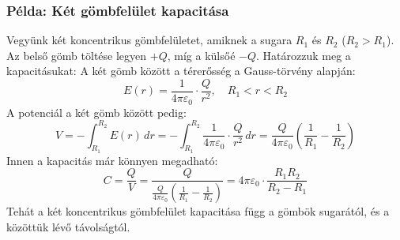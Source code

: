 \documentclass[a4paper,12pt]{article}
\begin{document}
\subsubsection*{Példa: Két gömbfelület kapacitása}
Vegyünk két koncentrikus gömbfelületet, amiknek a sugara $R_1$ és $R_2$ ($R_2 > R_1$). Az belső gömb töltése legyen $+Q$, míg a külsőé $-Q$. Határozzuk meg a kapacitásukat:
A két gömb között a térerősség a Gauss-törvény alapján:
\begin{equation}
    E(r) = \frac{1}{4 \pi \varepsilon_0} \cdot \frac{Q}{r^2}, \quad R_1 < r < R_2
\end{equation}
A potenciál a két gömb között pedig:
\begin{equation}
    V = - \int_{R_1}^{R_2} E(r) \, dr = - \int_{R_1}^{R_2} \frac{1}{4 \pi \varepsilon_0} \cdot \frac{Q}{r^2} \, dr = \frac{Q}{4 \pi \varepsilon_0} \left( \frac{1}{R_1} - \frac{1}{R_2} \right)
\end{equation}
Innen a kapacitás már könnyen megadható:
\begin{equation}
    C = \frac{Q}{V} = \frac{Q}{\frac{Q}{4 \pi \varepsilon_0} \left( \frac{1}{R_1} - \frac{1}{R_2} \right)} = 4 \pi \varepsilon_0 \cdot \frac{R_1 R_2}{R_2 - R_1}
\end{equation}
Tehát a két koncentrikus gömbfelület kapacitása függ a gömbök sugarától, és a közöttük lévő távolságtól.
\end{document}
